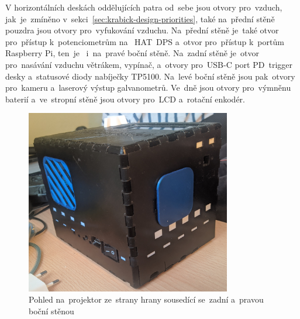 V horizontálních deskách oddělujících patra od~sebe jsou otvory  pro~vzduch,  jak~je~zmíněno  v~sekci~\ref{sec:krabick-design-priorities}, také na~přední stěně pouzdra jsou otvory  pro~vyfukování vzduchu. Na~přední stěně je~také otvor  pro~přístup  k~potenciometrům na ~HAT~DPS a~otvor  pro~přístup  k~portům Raspberry Pi,  ten~je ~i~na~pravé boční stěně.
Na~zadní stěně je~otvor  pro~nasávání vzduchu větrákem, vypínač, a~otvory  pro~USB-C port PD~trigger desky a~statusové diody nabíječky TP5100. Na~levé boční stěně jsou  pak~otvory  pro~kameru a~laserový výstup galvanometrů. Ve~dně jsou otvory  pro~výmněnu baterií a~ve~stropní stěně jsou otvory  pro~LCD a~rotační enkodér.

\begin{figure}[htb]
  \centering
  \includegraphics[width=0.8\textwidth]{img/hw_sides_backleft.jpg}
  \caption{\label{fig:hw_sides_backleft.jpg} Pohled na~projektor ze~strany hrany sousedící se~zadní a~pravou boční stěnou}
\end{figure}


